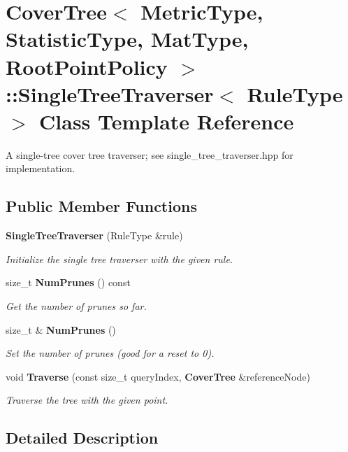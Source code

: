 \section{Cover\+Tree$<$ Metric\+Type, Statistic\+Type, Mat\+Type, Root\+Point\+Policy $>$\+:\+:Single\+Tree\+Traverser$<$ Rule\+Type $>$ Class Template Reference}
\label{classmlpack_1_1tree_1_1CoverTree_1_1SingleTreeTraverser}


A single-\/tree cover tree traverser; see single\+\_\+tree\+\_\+traverser.\+hpp for implementation.  


\subsection*{Public Member Functions}
\begin{DoxyCompactItemize}
\item 
\textbf{ Single\+Tree\+Traverser} (Rule\+Type \&rule)
\begin{DoxyCompactList}\small\item\em Initialize the single tree traverser with the given rule. \end{DoxyCompactList}\item 
size\+\_\+t \textbf{ Num\+Prunes} () const
\begin{DoxyCompactList}\small\item\em Get the number of prunes so far. \end{DoxyCompactList}\item 
size\+\_\+t \& \textbf{ Num\+Prunes} ()
\begin{DoxyCompactList}\small\item\em Set the number of prunes (good for a reset to 0). \end{DoxyCompactList}\item 
void \textbf{ Traverse} (const size\+\_\+t query\+Index, \textbf{ Cover\+Tree} \&reference\+Node)
\begin{DoxyCompactList}\small\item\em Traverse the tree with the given point. \end{DoxyCompactList}\end{DoxyCompactItemize}


\subsection{Detailed Description}
